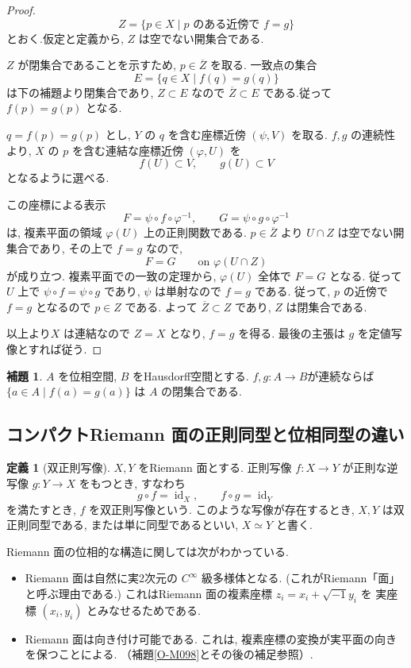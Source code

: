 \documentclass[dvipdfmx,a4paper,11pt]{article} %
\theoremstyle{definition}
\numberwithin{equation}{section}
\newtheorem{lem}[thm]{補題}
\newtheorem{dfn}[thm]{定義}
\begin{document}
\begin{proof}
\[
Z=\{p\in X\mid p\text{ のある近傍で }f=g\}
\]
とおく.仮定と定義から, $Z$ は空でない開集合である.

$Z$ が閉集合であることを示すため, $p\in\overline Z$ を取る.
一致点の集合
\[
E=\{q\in X\mid f(q)=g(q)\}
\]
は下の補題より閉集合であり, $Z\subset E$ なので
$\overline Z\subset E$ である.従って $f(p)=g(p)$ となる.


$q=f(p)=g(p)$ とし, $Y$ の $q$ を含む座標近傍 $(\psi,V)$ を取る.
$f,g$ の連続性より, $X$ の $p$ を含む連結な座標近傍 $(\varphi,U)$ を
\[
f(U)\subset V,\qquad g(U)\subset V
\]
となるように選べる.

この座標による表示
\[
F=\psi\circ f\circ \varphi^{-1},\qquad
G=\psi\circ g\circ \varphi^{-1}
\]
は, 複素平面の領域 $\varphi(U)$ 上の正則関数である.
$p\in\overline Z$ より $U\cap Z$ は空でない開集合であり, 
その上で $f=g$ なので, 
\[
F=G\qquad\text{on }\varphi(U\cap Z)
\]
が成り立つ.
複素平面での一致の定理から, $\varphi(U)$ 全体で $F=G$ となる.
従って $U$ 上で $\psi\circ f=\psi\circ g$ であり, 
$\psi$ は単射なので $f=g$ である.
従って, $p$ の近傍で $f=g$ となるので $p\in Z$ である.
よって $\overline Z\subset Z$ であり, $Z$ は閉集合である.

以上より$X$ は連結なので $Z=X$ となり, $f=g$ を得る.
最後の主張は $g$ を定値写像とすれば従う.
\end{proof}

\begin{lem}\label{O-M054}
$A$ を位相空間, $B$ をHausdorff空間とする.
$f, g : A\to B$が連続ならば
\(
\{a\in A\mid f(a)=g(a)\}
\)
は $A$ の閉集合である. 
\end{lem}

\subsection{コンパクトRiemann 面の正則同型と位相同型の違い}

\begin{dfn}[双正則写像]\label{O-M040}
$X,Y$ をRiemann 面とする.
正則写像 $f:X\to Y$ が正則な逆写像 $g:Y\to X$ をもつとき,
すなわち
\[
g\circ f=\operatorname{id}_X,\qquad
f\circ g=\operatorname{id}_Y
\]
を満たすとき, $f$ を双正則写像という.
このような写像が存在するとき,
$X,Y$ は双正則同型である, または単に同型であるといい,
$X\simeq Y$ と書く.
\end{dfn}

Riemann 面の位相的な構造に関しては次がわかっている.
\begin{itemize}
\item  Riemann 面は自然に実2次元の $C^\infty$ 級多様体となる.
(これがRiemann「面」と呼ぶ理由である.)
これはRiemann 面の複素座標 $z_i=x_i+\sqrt{-1}y_i$ を
実座標 $(x_i,y_i)$ とみなせるためである. 
\item  Riemann 面は向き付け可能である.
これは, 複素座標の変換が実平面の向きを保つことによる. （補題\ref{O-M098}とその後の補足参照）.
\end{itemize}
\end{document}
